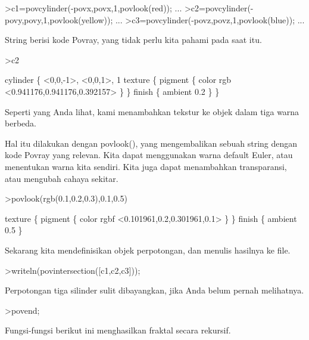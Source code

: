 \documentclass[12pt,Times new roman,letterpaper]{book}
\begin{document}
\begin{eulernootebook}
\begin{eulercomment}
\begin{eulercomment}
\begin{eulernootebook}
\begin{eulercomment}
\begin{eulercomment}
\begin{eulercomment}
\begin{eulercomment}
\begin{eulercomment}
\begin{eulercomment}
\begin{eulercomment}
\begin{eulernotebook}
\begin{eulercomment}
\end{eulercomment}
\begin{eulerprompt}
>c1=povcylinder(-povx,povx,1,povlook(red)); ...
>c2=povcylinder(-povy,povy,1,povlook(yellow)); ...
>c3=povcylinder(-povz,povz,1,povlook(blue)); ...
\end{eulerprompt}
\begin{eulercomment}
String berisi kode Povray, yang tidak perlu kita pahami pada saat itu.
\end{eulercomment}
\begin{eulerprompt}
>c2
\end{eulerprompt}
\begin{euleroutput}
  cylinder \{ <0,0,-1>, <0,0,1>, 1
   texture \{ pigment \{ color rgb <0.941176,0.941176,0.392157> \}  \} 
   finish \{ ambient 0.2 \} 
   \}
\end{euleroutput}
\begin{eulercomment}
Seperti yang Anda lihat, kami menambahkan tekstur ke objek dalam tiga
warna berbeda.

Hal itu dilakukan dengan povlook(), yang mengembalikan sebuah string
dengan kode Povray yang relevan. Kita dapat menggunakan warna default
Euler, atau menentukan warna kita sendiri. Kita juga dapat menambahkan
transparansi, atau mengubah cahaya sekitar.
\end{eulercomment}
\begin{eulerprompt}
>povlook(rgb(0.1,0.2,0.3),0.1,0.5)
\end{eulerprompt}
\begin{euleroutput}
   texture \{ pigment \{ color rgbf <0.101961,0.2,0.301961,0.1> \}  \} 
   finish \{ ambient 0.5 \} 
  
\end{euleroutput}
\begin{eulercomment}
Sekarang kita mendefinisikan objek perpotongan, dan menulis hasilnya
ke file.
\end{eulercomment}
\begin{eulerprompt}
>writeln(povintersection([c1,c2,c3]));
\end{eulerprompt}
\begin{eulercomment}
Perpotongan tiga silinder sulit dibayangkan, jika Anda belum pernah
melihatnya.
\end{eulercomment}
\begin{eulerprompt}
>povend;
\end{eulerprompt}
\begin{eulercomment}
Fungsi-fungsi berikut ini menghasilkan fraktal secara rekursif.


\end{eulercomment}
\end{eulernotebook}
\end{eulercomment}
\end{eulercomment}
\end{eulercomment}
\end{eulercomment}
\end{eulercomment}
\end{eulercomment}
\end{eulercomment}
\end{eulernootebook}
\end{eulercomment}
\end{eulercomment}
\end{eulernootebook}
\end{document}
